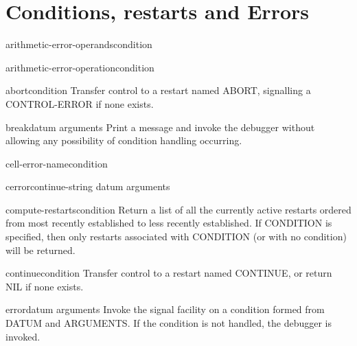 \chapter{Conditions, restarts and Errors}

\begin{function}{arithmetic-error-operands}{condition}
  
\end{function}

\begin{function}{arithmetic-error-operation}{condition}
  
\end{function}

\begin{function}{abort}{\op condition}
  Transfer control to a restart named ABORT, signalling a CONTROL-ERROR if
   none exists.
\end{function}

\begin{function}{break}{\op datum \rest arguments}
  Print a message and invoke the debugger without allowing any possibility
   of condition handling occurring.
\end{function}

\begin{function}{cell-error-name}{condition}
  
\end{function}

\begin{function}{cerror}{continue-string datum \rest arguments}
  
\end{function}

\begin{function}{compute-restarts}{\op condition}
  Return a list of all the currently active restarts ordered from most recently
established to less recently established. If CONDITION is specified, then only
restarts associated with CONDITION (or with no condition) will be returned.
\end{function}

\begin{function}{continue}{\op condition}
  Transfer control to a restart named CONTINUE, or return NIL if none exists.
\end{function}

\begin{function}{error}{datum \rest arguments}
  Invoke the signal facility on a condition formed from DATUM and ARGUMENTS.
  If the condition is not handled, the debugger is invoked.
\end{function}

